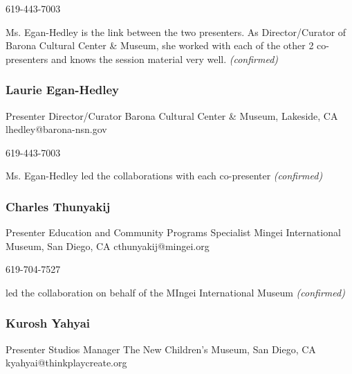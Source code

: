 \documentclass{report}
\begin{document}
                619-443-7003\newline

                Ms. Egan-Hedley is the link between the two presenters.  As Director/Curator of Barona Cultural Center \& Museum, she worked with each of the other 2 co-presenters and knows the session material very well.\newline
                \emph{ (confirmed) }
              

              
                \subsubsection*{ Laurie Egan-Hedley }
                Presenter\newline
                Director/Curator\newline
                Barona Cultural Center \& Museum, Lakeside, CA
                \newline
                lhedley@barona-nsn.gov\newline
                
                619-443-7003\newline

                Ms. Egan-Hedley led the collaborations with each co-presenter
                \emph{ (confirmed) }
              

              
                \subsubsection*{ Charles Thunyakij }
                Presenter\newline
                Education and Community Programs Specialist\newline
                Mingei International Museum, San Diego, CA
                \newline
                cthunyakij@mingei.org\newline
                
                619-704-7527\newline

                led the collaboration on behalf of the MIngei International Museum
                \emph{ (confirmed) }
              

              
                \subsubsection*{ Kurosh Yahyai }
                Presenter\newline
                Studios Manager\newline
                The New Children's Museum, San Diego, CA
                \newline
                kyahyai@thinkplaycreate.org\newline
                
\end{document}
